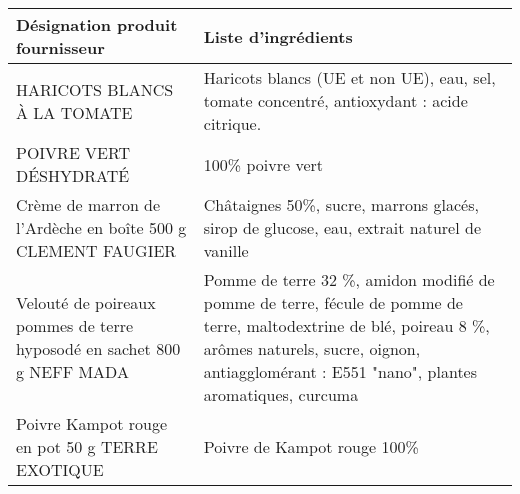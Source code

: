 \begin{tabular}{p{5cm}p{10cm}}
\toprule
                                        Désignation produit fournisseur &                                                                                                                                                                                              Liste d'ingrédients \\
\midrule
                                            HARICOTS BLANCS À LA TOMATE &                                                                                                                        Haricots blancs (UE et non UE), eau, sel, tomate concentré, antioxydant : acide citrique. \\
                                                 POIVRE VERT DÉSHYDRATÉ &                                                                                                                                                                                                 100\% poivre vert \\
            Crème de marron de l'Ardèche en boîte 500 g CLEMENT FAUGIER &                                                                                                                        Châtaignes 50\%, sucre, marrons glacés, sirop de glucose, eau, extrait naturel de vanille  \\
 Velouté de poireaux pommes de terre hyposodé en sachet 800 g NEFF MADA &  Pomme de terre 32 \%, amidon modifié de pomme de terre, fécule de pomme de terre, maltodextrine de blé, poireau 8 \%, arômes naturels, sucre, oignon, antiagglomérant : E551 "nano", plantes aromatiques, curcuma \\
                         Poivre Kampot rouge en pot 50 g TERRE EXOTIQUE &                                                                                                                                                                                      Poivre de Kampot rouge 100\% \\
\bottomrule
\end{tabular}
